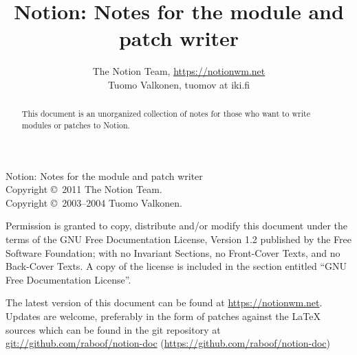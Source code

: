 \documentclass[english,a4paper,11pt,oldtoc,mctitle]{artikel3}
\title{Notion: Notes for the module and patch writer}
\author{The Notion Team, \url{https://notionwm.net} \\ 
	Tuomo Valkonen, tuomov at iki.fi}
\begin{document}
\maketitle

Notion: Notes for the module and patch writer\\
Copyright \copyright\  2011 The Notion Team.\\
Copyright \copyright\  2003--2004 Tuomo Valkonen.

Permission is granted to copy, distribute and/or modify this document
under the terms of the GNU Free Documentation License, Version 1.2
published by the Free Software Foundation;
with no Invariant Sections, no Front-Cover Texts, and no Back-Cover Texts.
A copy of the license is included in the section entitled ``GNU
Free Documentation License''.

The latest version of this document can be found at 
\url{https://notionwm.net}. Updates are
welcome, preferably in the form of patches against the \LaTeX{} sources which
can be found in the git repository at 
\url{git://github.com/raboof/notion-doc} 
(\url{https://github.com/raboof/notion-doc})

\bigskip

\begin{abstract}
    This document is an unorganized collection of notes for
    those who want to write modules or patches to Notion.
\end{abstract}

\tableofcontents













\appendix





\printindex
\end{document}
